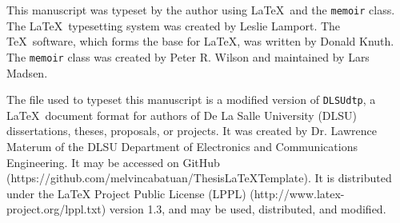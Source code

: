 This manuscript was typeset by the author using \LaTeX\  and the \texttt{memoir} class.
The \LaTeX\ typesetting system was created by Leslie Lamport.
The \TeX\ software, which forms the base for \LaTeX, was written by Donald Knuth.
The \texttt{memoir} class was created by Peter R. Wilson and maintained by Lars Madsen.

The file used to typeset this manuscript is a modified version of \texttt{DLSUdtp}, a \LaTeX\  document format for authors of De La Salle University (DLSU) dissertations, theses, proposals, or projects.
It was created by Dr. Lawrence Materum of the DLSU Department of Electronics and Communications Engineering.
It may be accessed on GitHub (https://github.com/melvincabatuan/ThesisLaTeXTemplate).
It is distributed under the LaTeX Project Public License (LPPL) (http://www.latex-project.org/lppl.txt) version 1.3, and may be used, distributed, and modified. 